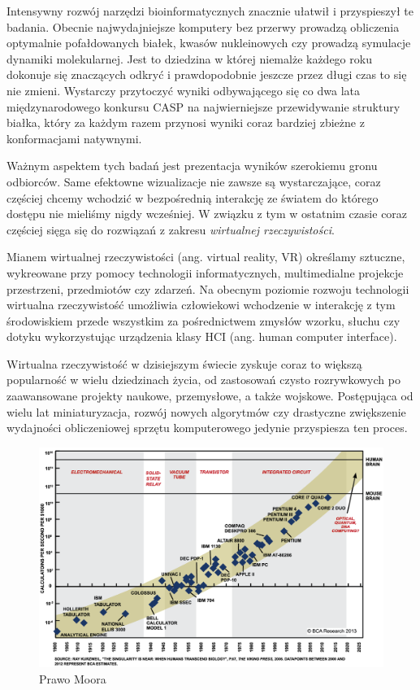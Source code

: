 \documentclass[licencjacka]{pracamgr}
\begin{document}
Intensywny rozwój narzędzi bioinformatycznych znacznie ułatwił i przyspieszył te badania. Obecnie najwydajniejsze komputery bez przerwy prowadzą obliczenia optymalnie pofałdowanych białek, kwasów nukleinowych czy prowadzą symulacje dynamiki molekularnej. Jest to dziedzina w której niemalże każdego roku dokonuje się znaczących odkryć i prawdopodobnie jeszcze przez długi czas to się nie zmieni. Wystarczy przytoczyć wyniki odbywającego się co dwa lata międzynarodowego konkursu CASP na najwierniejsze przewidywanie struktury białka, który za każdym razem przynosi wyniki coraz bardziej zbieżne z konformacjami natywnymi.

Ważnym aspektem tych badań jest prezentacja wyników szerokiemu gronu odbiorców. Same efektowne wizualizacje nie zawsze są wystarczające, coraz częściej chcemy wchodzić w bezpośrednią interakcję ze światem do którego dostępu nie mieliśmy nigdy wcześniej. W związku z tym w ostatnim czasie coraz częściej sięga się do rozwiązań z zakresu \textit{wirtualnej rzeczywistości}. 

Mianem wirtualnej rzeczywistości (ang. virtual reality, VR) określamy sztuczne, wykreowane przy pomocy technologii informatycznych, multimedialne projekcje przestrzeni, przedmiotów czy zdarzeń. Na obecnym poziomie rozwoju technologii wirtualna rzeczywistość umożliwia człowiekowi wchodzenie w interakcję z tym środowiskiem przede wszystkim za pośrednictwem zmysłów wzorku, słuchu czy dotyku wykorzystując urządzenia klasy HCI (ang. human computer interface). 

Wirtualna rzeczywistość w dzisiejszym świecie zyskuje coraz to większą popularność w wielu dziedzinach życia, od zastosowań czysto rozrywkowych po zaawansowane projekty naukowe, przemysłowe, a także wojskowe. Postępująca od wielu lat miniaturyzacja, rozwój nowych algorytmów czy drastyczne zwiększenie wydajności obliczeniowej sprzętu komputerowego jedynie przyspiesza ten proces.

\begin{figure}[H]
\centering
\includegraphics[scale=0.35,center]{MooresLaw}
\caption{Prawo Moora}
\end{figure}
\end{document}
